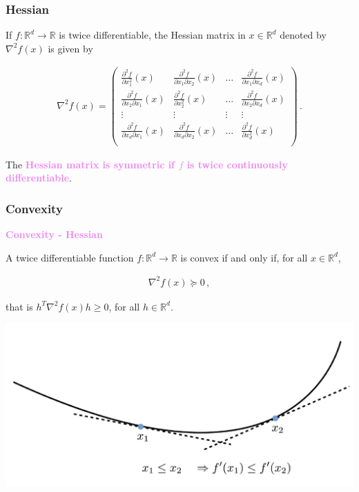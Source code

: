 \documentclass[9pt]{beamer}
\newcommand\R{\mathds{R}}
\begin{document}
\begin{frame}
	\frametitle{Hessian}
	
	\large 
	
	If $f: \R^d \to \R$ is \alert{twice differentiable}, the \alert{Hessian matrix in $x\in\R^d$} denoted by $\nabla^2 f(x)$ is given by
	
	\bigskip 

	
\begin{align*}
	\nabla^2 f (x) = 
	\begin{pmatrix}
	\frac{\partial^2 f}{\partial x_1^2}(x) & \frac{\partial^2 f}{\partial x_1 \partial x_2}(x) & \hdots & \frac{\partial^2 f}{\partial x_1 \partial x_d}(x) \\
	\frac{\partial^2 f}{\partial x_2 \partial x_1}(x) & \frac{\partial^2 f}{\partial x_2^2}(x) & \hdots & \frac{\partial^2 f}{\partial x_2 \partial x_d}(x) \\
	\vdots & \vdots & \vdots & \vdots \\
	\frac{\partial^2 f}{\partial x_d \partial x_1}(x) & \frac{\partial^2 f}{\partial x_d \partial x_2}(x) & \hdots & \frac{\partial^2 f}{\partial x_d^2}(x) \\
	\end{pmatrix}\,.
\end{align*}

\bigskip 
	\bigskip 

The \textbf{\textcolor{violet}{Hessian matrix is symmetric if $f$ is twice continuously differentiable}}.

\end{frame}

\begin{frame}
	\frametitle{Convexity}
	
\textbf{\textcolor{violet}{Convexity - Hessian}}

A \alert{twice differentiable function $f : \R^d \to \R$} is convex if and only if, for all $x\in\R^d$,

\begin{align*}
\nabla^2 f(x) \succeq 0\,, 
\end{align*}

that is $h^T \nabla^2 f(x) h \geqslant 0$, for all $h \in \R^d$.

\vspace{0.4cm}

	\begin{center}
		\includegraphics[scale=0.6]{./picture_convexity3}
	\end{center}
\end{frame}
\end{document}
